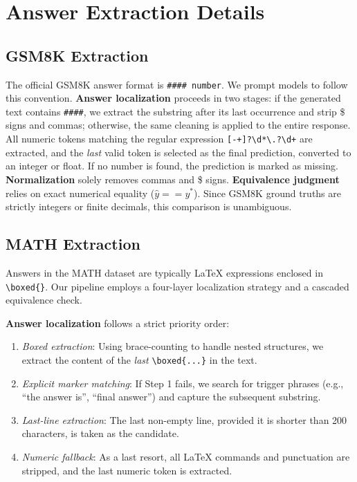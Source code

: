 \documentclass{article}
\begin{document}
\section{Answer Extraction Details}
\label{app:pipeline}

\subsection{GSM8K Extraction}

The official GSM8K answer format is \texttt{\#\#\#\# number}. We prompt models to follow this convention. \textbf{Answer localization} proceeds in two stages: if the generated text contains \texttt{\#\#\#\#}, we extract the substring after its last occurrence and strip \$ signs and commas; otherwise, the same cleaning is applied to the entire response. All numeric tokens matching the regular expression \texttt{[-+]?\textbackslash d*\textbackslash.?\textbackslash d+} are extracted, and the \textit{last} valid token is selected as the final prediction, converted to an integer or float. If no number is found, the prediction is marked as missing.
\textbf{Normalization} solely removes commas and \$ signs. \textbf{Equivalence judgment} relies on exact numerical equality ($\hat{y} == y^*$). Since GSM8K ground truths are strictly integers or finite decimals, this comparison is unambiguous.

\subsection{MATH Extraction}
Answers in the MATH dataset are typically LaTeX expressions enclosed in \texttt{\textbackslash boxed\{\}}. Our pipeline employs a four-layer localization strategy and a cascaded equivalence check.

\textbf{Answer localization} follows a strict priority order:
\begin{enumerate}
    \item \textit{Boxed extraction}: Using brace-counting to handle nested structures, we extract the content of the \textit{last} \texttt{\textbackslash boxed\{...\}} in the text.
    \item \textit{Explicit marker matching}: If Step 1 fails, we search for trigger phrases (e.g., ``the answer is'', ``final answer'') and capture the subsequent substring.
    \item \textit{Last-line extraction}: The last non-empty line, provided it is shorter than 200 characters, is taken as the candidate.
    \item \textit{Numeric fallback}: As a last resort, all LaTeX commands and punctuation are stripped, and the last numeric token is extracted.
\end{enumerate}
\end{document}
